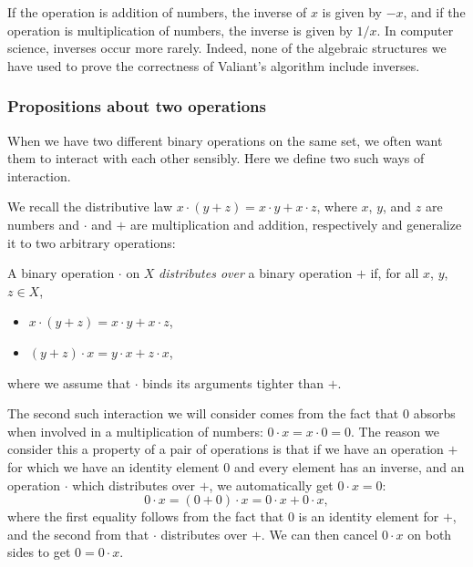 If the operation is addition of numbers, the inverse of $x$ is given by $-x$, and if the operation is multiplication of numbers, the inverse is given by $1/x$. In computer science, inverses occur more rarely.
Indeed, none of the algebraic structures we have used to prove the correctness of Valiant's algorithm include inverses.

\subsubsection{Propositions about two operations}
\label{two-operations}
When we have two different binary operations on the same set, we often want them to interact with each other sensibly. Here we define two such ways of interaction.

We recall the distributive law $x\cdot(y + z) = x\cdot y + x\cdot z$, where $x$, $y$, and $z$ are numbers and $\cdot$ and $+$ are multiplication and addition, respectively and generalize it to two arbitrary operations:
\begin{Definition}
  A binary operation $\cdot$ on $X$ \emph{distributes over} a binary operation $+$ if, for all $x$, $y$, $z \in X$,
  \begin{itemize}
  \item $x \cdot (y + z) = x \cdot y + x \cdot z$,
  \item $(y + z) \cdot x = y \cdot x + z \cdot x$,
  \end{itemize}
  where we assume that $\cdot$ binds its arguments tighter than $+$.
\end{Definition}

\label{zero-element}
The second such interaction we will consider comes from the fact that $0$ absorbs when involved in a multiplication of numbers: $0 \cdot x = x \cdot 0 = 0$. The reason we consider this a property of a pair of operations is that if we have an operation $+$ for which we have an identity element $0$ and every element has an inverse, and an operation $\cdot$ which distributes over $+$, we automatically get $0 \cdot x = 0$:
\begin{equation*}
  0 \cdot x = (0 + 0) \cdot x = 0 \cdot x + 0 \cdot x,
\end{equation*}
where the first equality follows from the fact that $0$ is an identity element for $+$, and the second from that $\cdot$ distributes over $+$. We can then cancel $0 \cdot x$ on both sides to get $0 = 0 \cdot x$.


